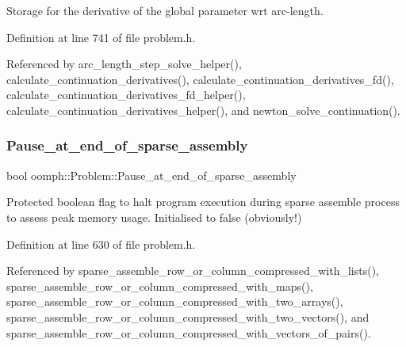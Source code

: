 Storage for the derivative of the global parameter wrt arc-\/length. 



Definition at line 741 of file problem.\+h.



Referenced by arc\+\_\+length\+\_\+step\+\_\+solve\+\_\+helper(), calculate\+\_\+continuation\+\_\+derivatives(), calculate\+\_\+continuation\+\_\+derivatives\+\_\+fd(), calculate\+\_\+continuation\+\_\+derivatives\+\_\+fd\+\_\+helper(), calculate\+\_\+continuation\+\_\+derivatives\+\_\+helper(), and newton\+\_\+solve\+\_\+continuation().

\mbox{\label{classoomph_1_1Problem_aedefa8337ace6043c2fdfd5a2d19afd3}} 
\subsubsection{\texorpdfstring{Pause\+\_\+at\+\_\+end\+\_\+of\+\_\+sparse\+\_\+assembly}{Pause\_at\_end\_of\_sparse\_assembly}}
{\footnotesize\ttfamily bool oomph\+::\+Problem\+::\+Pause\+\_\+at\+\_\+end\+\_\+of\+\_\+sparse\+\_\+assembly\hspace{0.3cm}{\ttfamily [protected]}}



Protected boolean flag to halt program execution during sparse assemble process to assess peak memory usage. Initialised to false (obviously!) 



Definition at line 630 of file problem.\+h.



Referenced by sparse\+\_\+assemble\+\_\+row\+\_\+or\+\_\+column\+\_\+compressed\+\_\+with\+\_\+lists(), sparse\+\_\+assemble\+\_\+row\+\_\+or\+\_\+column\+\_\+compressed\+\_\+with\+\_\+maps(), sparse\+\_\+assemble\+\_\+row\+\_\+or\+\_\+column\+\_\+compressed\+\_\+with\+\_\+two\+\_\+arrays(), sparse\+\_\+assemble\+\_\+row\+\_\+or\+\_\+column\+\_\+compressed\+\_\+with\+\_\+two\+\_\+vectors(), and sparse\+\_\+assemble\+\_\+row\+\_\+or\+\_\+column\+\_\+compressed\+\_\+with\+\_\+vectors\+\_\+of\+\_\+pairs().

\mbox{\label{classoomph_1_1Problem_a5c6bd262be3544343a30767da278d846}} 
